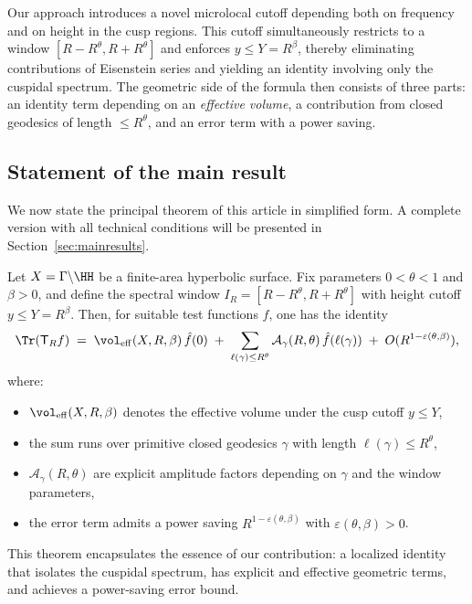 Our approach introduces a novel microlocal cutoff depending both on frequency and on height in the cusp regions. 
This cutoff simultaneously restricts to a window $[R-R^{\theta},R+R^{\theta}]$ and enforces $y\le Y=R^\beta$, thereby eliminating contributions of Eisenstein series and yielding an identity involving only the cuspidal spectrum. 
The geometric side of the formula then consists of three parts: an identity term depending on an \emph{effective volume}, a contribution from closed geodesics of length $\le R^{\theta}$, and an error term with a power saving.

\subsection{Statement of the main result}

We now state the principal theorem of this article in simplified form. 
A complete version with all technical conditions will be presented in Section~\ref{sec:mainresults}.

\begin{theorem}\label{thm:intro}
Let $X=\Gamma\backslash\HH$ be a finite-area hyperbolic surface. 
Fix parameters $0<\theta<1$ and $\beta>0$, and define the spectral window $I_R=[R-R^{\theta},R+R^{\theta}]$ with height cutoff $y\le Y=R^\beta$. 
Then, for suitable test functions $f$, one has the identity
\[
\Tr(\mathsf{T}_R f) \;=\; \vol_{\mathrm{eff}}(X,R,\beta)\, \hat{f}(0) \;+\; \sum_{\ell(\gamma)\le R^{\theta}} \mathcal{A}_\gamma(R,\theta) \, \hat{f}(\ell(\gamma)) \;+\; O(R^{1-\varepsilon(\theta,\beta)}),
\]
where:
\begin{itemize}
  \item $\vol_{\mathrm{eff}}(X,R,\beta)$ denotes the effective volume under the cusp cutoff $y\le Y$,
  \item the sum runs over primitive closed geodesics $\gamma$ with length $\ell(\gamma)\le R^{\theta}$,
  \item $\mathcal{A}_\gamma(R,\theta)$ are explicit amplitude factors depending on $\gamma$ and the window parameters,
  \item the error term admits a power saving $R^{1-\varepsilon(\theta,\beta)}$ with $\varepsilon(\theta,\beta)>0$.
\end{itemize}
\end{theorem}

This theorem encapsulates the essence of our contribution: a localized identity that isolates the cuspidal spectrum, has explicit and effective geometric terms, and achieves a power-saving error bound.

